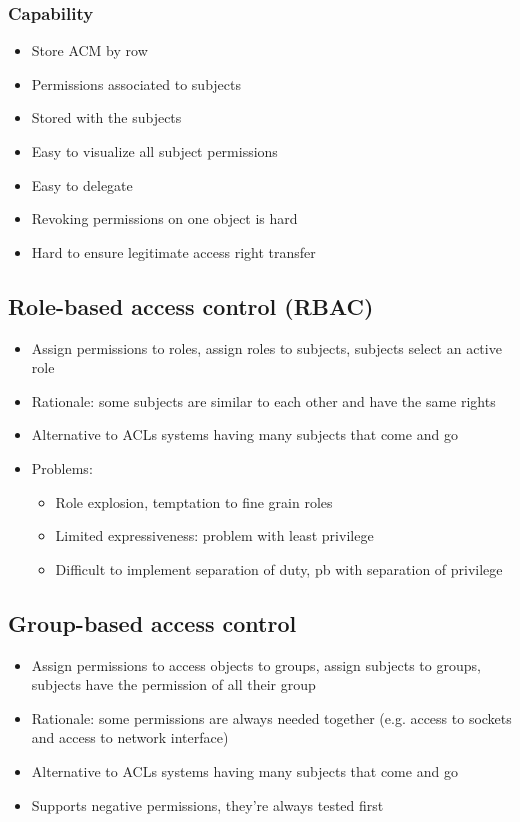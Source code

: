 \documentclass{article}
\newenvironment{myitemize}
{ \begin{itemize}
    \setlength{\itemsep}{005pt}
    \setlength{\parskip}{0pt}
    \setlength{\parsep}{0pt}     }
{ \end{itemize}                  }
\begin{document}
\begin{multicols}{2}
\subsubsection{Capability}

\begin{myitemize}
    \item Store ACM by row
    \item Permissions associated to subjects
    \item Stored with the subjects
    \item Easy to visualize all subject permissions
    \item Easy to delegate
    \item Revoking permissions on one object is hard
    \item Hard to ensure legitimate access right transfer
\end{myitemize}


\subsection{Role-based access control (RBAC)}

\begin{myitemize}
    \item Assign permissions to roles, assign roles to subjects, subjects select an active role
    \item Rationale: some subjects are similar to each other and have the same rights
    \item Alternative to ACLs systems having many subjects that come and go
    \item Problems:
    \begin{myitemize}
        \item Role explosion, temptation to fine grain roles
        \item Limited expressiveness: problem with least privilege
        \item Difficult to implement separation of duty, pb with separation of privilege 
    \end{myitemize}

\end{myitemize}

\subsection{Group-based access control}

\begin{myitemize}
    \item Assign permissions to access objects to groups, assign subjects to groups, subjects have the permission of all their group
    \item Rationale: some permissions are always needed together (e.g. access to sockets and access to network interface)
    \item Alternative to ACLs systems having many subjects that come and go
    \item Supports negative permissions, they’re always tested first 
\end{myitemize}



\end{multicols}
\end{document}
